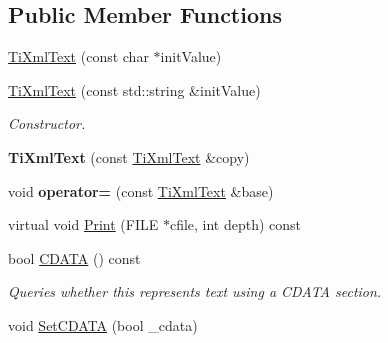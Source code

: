 \subsection*{Public Member Functions}
\begin{DoxyCompactItemize}
\item 
\hyperlink{class_ti_xml_text_af659e77c6b87d684827f35a8f4895960}{TiXmlText} (const char $\ast$initValue)
\item 
\hypertarget{class_ti_xml_text_a439792f6183a3d3fb6f2bc2b16fa5691}{
\hyperlink{class_ti_xml_text_a439792f6183a3d3fb6f2bc2b16fa5691}{TiXmlText} (const std::string \&initValue)}
\label{class_ti_xml_text_a439792f6183a3d3fb6f2bc2b16fa5691}

\begin{DoxyCompactList}\small\item\em Constructor. \item\end{DoxyCompactList}\item 
\hypertarget{class_ti_xml_text_a8d2cc1b4af2208cbb0171cf20f6815d1}{
{\bfseries TiXmlText} (const \hyperlink{class_ti_xml_text}{TiXmlText} \&copy)}
\label{class_ti_xml_text_a8d2cc1b4af2208cbb0171cf20f6815d1}

\item 
\hypertarget{class_ti_xml_text_af5f15d40d048cea7cab9d0eb4fd8a7d2}{
void {\bfseries operator=} (const \hyperlink{class_ti_xml_text}{TiXmlText} \&base)}
\label{class_ti_xml_text_af5f15d40d048cea7cab9d0eb4fd8a7d2}

\item 
virtual void \hyperlink{class_ti_xml_text_a0cafbf6f236c7f02d12b2bffc2b7976b}{Print} (FILE $\ast$cfile, int depth) const 
\item 
\hypertarget{class_ti_xml_text_ad1a6a6b83fa2271022dd97c072a2b586}{
bool \hyperlink{class_ti_xml_text_ad1a6a6b83fa2271022dd97c072a2b586}{CDATA} () const }
\label{class_ti_xml_text_ad1a6a6b83fa2271022dd97c072a2b586}

\begin{DoxyCompactList}\small\item\em Queries whether this represents text using a CDATA section. \item\end{DoxyCompactList}\item 
\hypertarget{class_ti_xml_text_acb17ff7c5d09b2c839393445a3de5ea9}{
void \hyperlink{class_ti_xml_text_acb17ff7c5d09b2c839393445a3de5ea9}{SetCDATA} (bool \_\-cdata)}
\label{class_ti_xml_text_acb17ff7c5d09b2c839393445a3de5ea9}


\end{DoxyCompactItemize}
